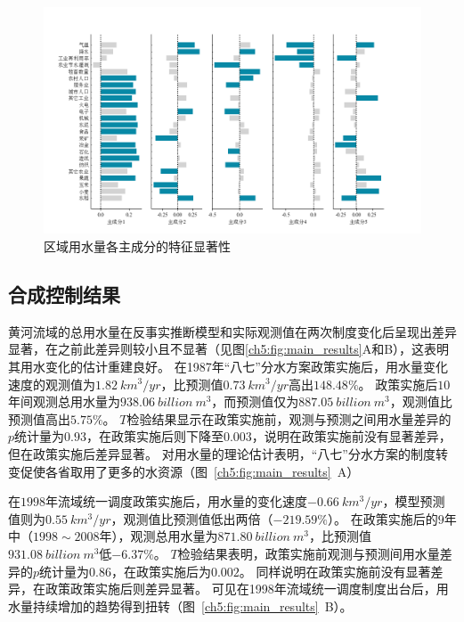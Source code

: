 \begin{figure}[!ht]
    \centering
    \includegraphics[width=\textwidth]{img/ch5/ch5_variables.png}
    \caption{区域用水量各主成分的特征显著性}\label{ch5:fig:variables}
\end{figure}

\subsection{合成控制结果}\label{result-2}

黄河流域的总用水量在反事实推断模型和实际观测值在两次制度变化后呈现出差异显著，在之前此差异则较小且不显著（见图\ref{ch5:fig:main_results}A和B），这表明其用水变化的估计重建良好。
在1987年“八七”分水方案政策实施后，用水量变化速度的观测值为$1.82~km^3/yr$，比预测值$0.73~km^3/yr$高出$148.48\%$。
政策实施后$10$年间观测总用水量为$938.06~billion~m^3$，而预测值仅为$887.05~billion~m^3$，观测值比预测值高出$5.75\%$。
$T$检验结果显示在政策实施前，观测与预测之间用水量差异的$p$统计量为$0.93$，在政策实施后则下降至$0.003$，说明在政策实施前没有显著差异，但在政策实施后差异显著。
对用水量的理论估计表明，“八七”分水方案的制度转变促使各省取用了更多的水资源（图~\ref{ch5:fig:main_results}~A）

在$1998$年流域统一调度政策实施后，用水量的变化速度$-0.66~km^3/yr$，模型预测值则为$0.55~km^3/yr$，观测值比预测值低出两倍（$-219.59\%$）。
在政策实施后的$9$年中（$1998 \sim 2008$年），观测总用水量为$871.80~billion~m^3$，比预测值$931.08~billion~m^3$低$-6.37\%$。
$T$检验结果表明，政策实施前观测与预测间用水量差异的$p$统计量为$0.86$，在政策实施后为$0.002$。
同样说明在政策实施前没有显著差异，在政策政策实施后则差异显著。
可见在1998年流域统一调度制度出台后，用水量持续增加的趋势得到扭转（图~\ref{ch5:fig:main_results}~B）。

